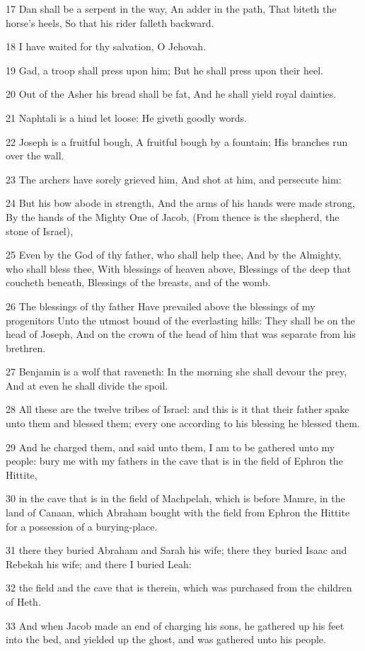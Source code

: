 \par 17 Dan shall be a serpent in the way, An adder in the path, That biteth the horse's heels, So that his rider falleth backward.
\par 18 I have waited for thy salvation, O Jehovah.
\par 19 Gad, a troop shall press upon him; But he shall press upon their heel.
\par 20 Out of the Asher his bread shall be fat, And he shall yield royal dainties.
\par 21 Naphtali is a hind let loose: He giveth goodly words.
\par 22 Joseph is a fruitful bough, A fruitful bough by a fountain; His branches run over the wall.
\par 23 The archers have sorely grieved him, And shot at him, and persecute him:
\par 24 But his bow abode in strength, And the arms of his hands were made strong, By the hands of the Mighty One of Jacob, (From thence is the shepherd, the stone of Israel),
\par 25 Even by the God of thy father, who shall help thee, And by the Almighty, who shall bless thee, With blessings of heaven above, Blessings of the deep that coucheth beneath, Blessings of the breasts, and of the womb.
\par 26 The blessings of thy father Have prevailed above the blessings of my progenitors Unto the utmost bound of the everlasting hills: They shall be on the head of Joseph, And on the crown of the head of him that was separate from his brethren.
\par 27 Benjamin is a wolf that raveneth: In the morning she shall devour the prey, And at even he shall divide the spoil.
\par 28 All these are the twelve tribes of Israel: and this is it that their father spake unto them and blessed them; every one according to his blessing he blessed them.
\par 29 And he charged them, and said unto them, I am to be gathered unto my people: bury me with my fathers in the cave that is in the field of Ephron the Hittite,
\par 30 in the cave that is in the field of Machpelah, which is before Mamre, in the land of Canaan, which Abraham bought with the field from Ephron the Hittite for a possession of a burying-place.
\par 31 there they buried Abraham and Sarah his wife; there they buried Isaac and Rebekah his wife; and there I buried Leah:
\par 32 the field and the cave that is therein, which was purchased from the children of Heth.
\par 33 And when Jacob made an end of charging his sons, he gathered up his feet into the bed, and yielded up the ghost, and was gathered unto his people.

